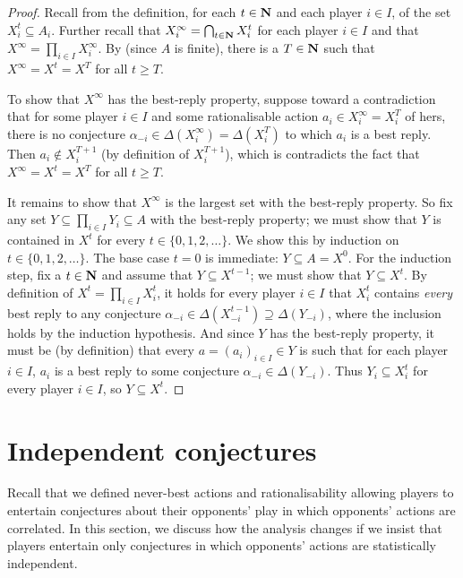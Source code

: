 \begin{proof}
	Recall from  the definition, for each $t \in \mathbf{N}$ and each player $i \in I$, of the set $X^t_i \subseteq A_i$. Further recall that $X^\infty_i = \bigcap_{t \in \mathbf{N}} X^t_i$ for each player $i \in I$ and that $X^\infty = \prod_{i \in I} X^\infty_i$. By  (since $A$ is finite), there is a $T \in \mathbf{N}$ such that $X^\infty = X^t = X^T$ for all $t \geq T$.
	
	To show that $X^\infty$ has the best-reply property, suppose toward a contradiction that for some player $i \in I$ and some rationalisable action $a_i \in X^\infty_i = X^T_i$ of hers, there is no conjecture $\alpha_{-i} \in \Delta(X^\infty_i) = \Delta(X^T_i)$ to which $a_i$ is a best reply. Then $a_i \notin X^{T+1}_i$ (by definition of $X^{T+1}_i$), which is contradicts the fact that $X^\infty = X^t = X^T$ for all $t \geq T$.

	It remains to show that $X^\infty$ is the largest set with the best-reply property. So fix any set $Y \subseteq \prod_{i \in I} Y_i \subseteq A$ with the best-reply property; we must show that $Y$ is contained in $X^t$ for every $t \in \{0,1,2,\dots\}$. We show this by induction on $t \in \{0,1,2,\dots\}$. The base case $t=0$ is immediate: $Y \subseteq A = X^0$. For the induction step, fix a $t \in \mathbf{N}$ and assume that $Y \subseteq X^{t-1}$; we must show that $Y \subseteq X^t$. By definition of $X^t = \prod_{i \in I} X^t_i$, it holds for every player $i \in I$ that $X^t_i$ contains \emph{every} best reply to any conjecture $\alpha_{-i} \in \Delta( X^{t-1}_{-i} ) \supseteq \Delta( Y_{-i} )$, where the inclusion holds by the induction hypothesis. And since $Y$ has the best-reply property, it must be (by definition) that every $a = (a_i)_{i \in I} \in Y$ is such that for each player $i \in I$, $a_i$ is a best reply to some conjecture $\alpha_{-i} \in \Delta( Y_{-i} )$. Thus $Y_i \subseteq X^t_i$ for every player $i \in I$, so $Y \subseteq X^t$.
\end{proof}



\section{Independent conjectures}
\label{dom:indp}

Recall that we defined never-best actions and rationalisability allowing players to entertain conjectures about their opponents' play in which opponents' actions are correlated. In this section, we discuss how the analysis changes if we insist that players entertain only conjectures in which opponents' actions are statistically independent.

